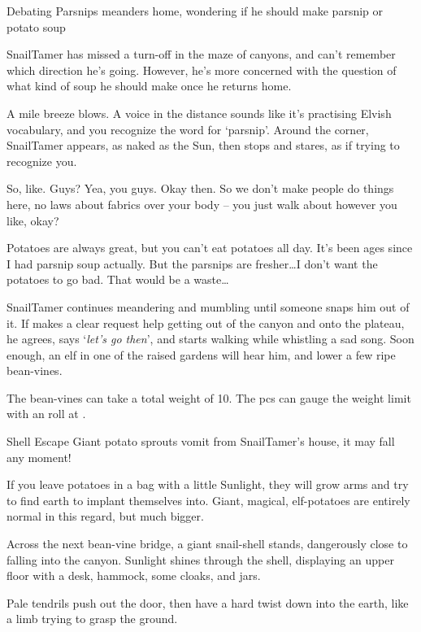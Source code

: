 
{Debating Parsnips}%
{ meanders home, wondering if he should make parsnip or potato soup}%

\Gls{SnailTamer} has missed a turn-off in the maze of canyons, and can't remember which direction he's going.
However, he's more concerned with the question of what kind of soup he should make once he returns home.

\begin{boxtext}
  A mile breeze blows.
  A voice in the distance sounds like it's practising Elvish vocabulary, and you recognize the word for `parsnip'.
  Around the corner, \gls{SnailTamer} appears, as naked as the Sun, then stops and stares, as if trying to recognize you.
\end{boxtext}

\begin{speechtext}
  So, like.  Guys?  Yea, you guys.  Okay then.  So we don't make people do things here, no laws about fabrics over your body -- you just walk about however you like, okay?

  Potatoes are always great, but you can't eat potatoes all day.
  It's been ages since I had parsnip soup actually.
  But the parsnips are fresher\ldots I don't want the potatoes to go bad.
  That would be a waste\ldots
\end{speechtext}

\Gls{SnailTamer} continues meandering and mumbling until someone snaps him out of it.
If  makes a clear request help getting out of the canyon and onto the plateau, he agrees, says `\textit{let's go then}', and starts walking while whistling a sad song.
Soon enough, an elf in one of the raised gardens will hear him, and lower a few ripe bean-vines.

The bean-vines can take a total \gls{weight} of 10.
The \glspl{pc} can gauge the weight limit with an  roll at \tn[8].

{Shell Escape}%
{Giant potato sprouts vomit from \gls{SnailTamer}'s house, it may fall any moment!}%

If you leave potatoes in a bag with a little Sunlight, they will grow arms and try to find earth to implant themselves into.
Giant, magical, elf-potatoes are entirely normal in this regard, but much bigger.

\begin{speechtext}
  Across the next bean-vine bridge, a giant snail-shell stands, dangerously close to falling into the canyon.
  Sunlight shines through the shell, displaying an upper floor with a desk, hammock, some cloaks, and jars.

  Pale tendrils push out the door, then have a hard twist down into the earth, like a limb trying to grasp the ground.
\end{speechtext}

